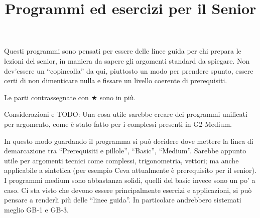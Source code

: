 \documentclass[a4paper,10pt]{article}
\title{Programmi ed esercizi per il Senior}
\date{}
\begin{document}
\maketitle

Questi programmi sono pensati per essere delle linee guida per chi prepara le lezioni del senior, in maniera da sapere gli argomenti standard da spiegare. Non dev'essere un ``copincolla'' da qui, piuttosto un modo per prendere spunto, essere certi di non dimenticare nulla e fissare un livello coerente di prerequisiti.

\bigskip

Le parti contrassegnate con $\bigstar$ sono in più.

\vspace{0.7cm}
Considerazioni e TODO: Una cosa utile sarebbe creare dei programmi unificati per argomento, come è stato fatto per i complessi presenti in G2-Medium. 

In questo modo guardando il programma si può decidere dove mettere la linea di demarcazione tra ``Prerequisiti e pillole'', ``Basic'', ``Medium''. Sarebbe appunto utile per argomenti tecnici come complessi, trigonometria, vettori; ma anche applicabile a sintetica (per esempio Ceva attualmente è prerequisito per il senior).\\

I programmi medium sono abbastanza solidi, quelli del basic invece sono un po' a caso. Ci sta visto che devono essere principalmente esercizi e applicazioni, si può pensare a renderli più delle ``linee guida''. In particolare andrebbero sistemati meglio GB-1 e GB-3.


\clearpage

\vspace{1cm}
 
 \clearpage
 
 
 \clearpage
 
 
 \clearpage 
\end{document}
